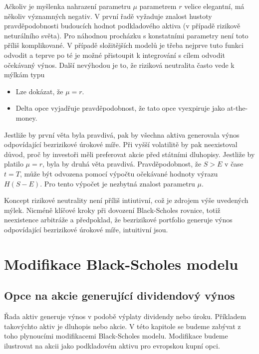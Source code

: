 \documentclass[a4paper]{book}
\begin{document}
Ačkoliv je myšlenka nahrazení parametru $\mu$ parametrem $r$ velice elegantní, má několiv významných negativ. V první řadě vyžaduje znalost hustoty pravděpodobnosti budoucích hodnot podkladového aktiva (v případě rizikově neturálního světa). Pro náhodnou procházku s konstatními parametry není toto příliš komplikované. V případě složitějších modelů je třeba nejprve tuto funkci odvodit a teprve po té je možné přistoupit k integrování s cílem odvodit očekávaný výnos. Další nevýhodou je to, že riziková neutralita často vede k mýlkám typu
\begin{itemize}
\item Lze dokázat, že $\mu = r$.
\item Delta opce vyjadřuje pravděpodobnost, že tato opce vyexpiruje jako at-the-money.
\end{itemize}
Jestliže by první věta byla pravdivá, pak by všechna aktiva generovala výnos odpovídající bezrizikové úrokové míře. Při vyšší volatilitě by pak neexistoval důvod, proč by investoři měli preferovat akcie před státními dluhopisy. Jestliže by platilo $\mu = r$, byla by druhá věta pravdivá. Pravděpodobnost, že $S > E$ v čase $t = T$, může být odvozena pomocí výpočtu očekávané hodnoty výrazu $H(S -E)$. Pro tento výpočet je nezbytná znalost parametru $\mu$.

Koncept rizikové neutrality není příliš intiutivní, což je zdrojem výše uvedených mýlek. Nicméně klíčové kroky při dovození Black-Scholes rovnice, totiž neexistence arbitráže a předpoklad, že bezrizikové portfolio generuje výnos odpovídající bezrizikové úrokové míře, intuitivní jsou. 

\chapter{Modifikace Black-Scholes modelu}

\section{Opce na akcie generující dividendový výnos}

Řada aktiv generuje výnos v podobě výplaty dividendy nebo úroku. Příkladem takovýchto aktiv je dluhopis nebo akcie. V této kapitole se budeme zabývat z toho plynoucími modifikacemi Black-Scholes modelu. Modifikace budeme ilustrovat na akcii jako podkladovém aktivu pro evropskou kupní opci.
\end{document}
